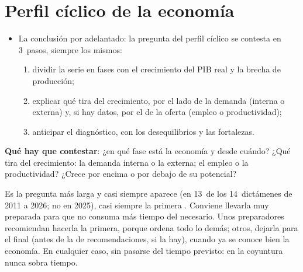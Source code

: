 \documentclass[11pt]{article}
\begin{document}
\section{Perfil cíclico de la economía}\label{sec:perfil}

\begin{itemize}
\item La conclusión por adelantado: la pregunta del perfil cíclico se contesta en 3~pasos, siempre los mismos:
  \begin{enumerate}
  \item dividir la serie en fases con el crecimiento del PIB real y la brecha de producción;
  \item explicar qué tira del crecimiento, por el lado de la demanda (interna o externa) y, si hay datos, por el de la oferta (empleo o productividad);
  \item anticipar el diagnóstico, con los desequilibrios y las fortalezas.
  \end{enumerate}
\end{itemize}

\begin{infografia}[!htb]
\centering
\caption{Los 3~pasos del perfil cíclico}\label{figu:esquema-perfil}
\end{infografia}

\begin{ideaclave}
\textbf{Qué hay que contestar}: ¿en qué fase está la economía y desde cuándo? ¿Qué tira del crecimiento: la demanda interna o la externa; el empleo o la productividad? ¿Crece por encima o por debajo de su potencial?
\end{ideaclave}

\begin{notaopositor}
Es la pregunta más larga y casi siempre aparece (en 13~de los 14~dictámenes de 2011 a 2026; no en 2025), casi siempre la primera \parencite{ATCEE2026Examenes}. Conviene llevarla muy preparada para que no consuma más tiempo del necesario. Unos preparadores recomiendan hacerla la primera, porque ordena todo lo demás; otros, dejarla para el final (antes de la de recomendaciones, si la hay), cuando ya se conoce bien la economía. En cualquier caso, sin pasarse del tiempo previsto: en la coyuntura nunca sobra tiempo.
\end{notaopositor}
\end{document}

